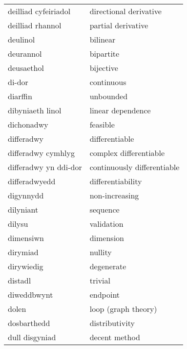 \begin{supertabular}{p{0.22\textwidth}p{0.22\textwidth}}
           deilliad cyfeiriadol &           directional derivative \\
               deilliad rhannol &               partial derivative \\
                       deulinol &                         bilinear \\
                      deurannol &                        bipartite \\
                     deusaethol &                        bijective \\
                         di-dor &                       continuous \\
                       diarffin &                        unbounded \\
               dibyniaeth linol &                linear dependence \\
                     dichonadwy &                         feasible \\
                     differadwy &                   differentiable \\
             differadwy cymhlyg &           complex differentiable \\
          differadwy yn ddi-dor &      continuously differentiable \\
                  differadwyedd &                differentiability \\
                      digynnydd &                   non-increasing \\
                      dilyniant &                         sequence \\
                         dilysu &                       validation \\
                      dimensiwn &                        dimension \\
                       dirymiad &                          nullity \\
                     dirywiedig &                       degenerate \\
                        distadl &                          trivial \\
                    diweddbwynt &                         endpoint \\
                          dolen &              loop (graph theory) \\
                    dosbarthedd &                   distributivity \\
                 dull disgyniad &                    decent method \\

\end{supertabular}
